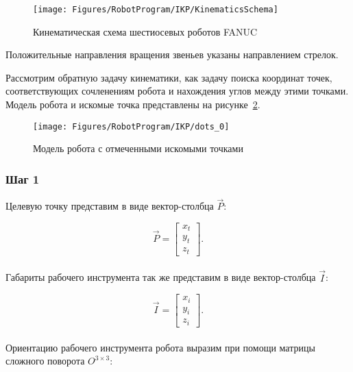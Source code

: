 \begin{figure}[H]
    \centering
    \vspace{14pt}
    \texttt{[image: Figures/RobotProgram/IKP/KinematicsSchema]}
    \caption{Кинематическая схема шестиосевых роботов FANUC}
    \label{fig:RobotProgram:IKP:KinematicsSchema}
\end{figure}

Положительные направления вращения звеньев указаны направлением стрелок.

Рассмотрим обратную задачу кинематики, как задачу поиска координат точек, соответствующих сочленениям робота и нахождения углов между этими точками.
Модель робота и искомые точка представлены на рисунке~\ref{fig:RobotProgram:IKP:dots_0}.

\begin{figure}[H]
    \centering
    \vspace{14pt}
    \texttt{[image: Figures/RobotProgram/IKP/dots\_0]}
    \caption{Модель робота с отмеченными искомыми точками}
    \label{fig:RobotProgram:IKP:dots_0}
\end{figure}

\subsubsection*{Шаг 1}
Целевую точку представим в виде вектор-столбца $\overrightarrow{P}$:

\begin{equation*}
    \overrightarrow{P} =
    \begin{bmatrix}
        x_t \\
        y_t \\
        z_t
    \end{bmatrix}.
\end{equation*} \\

Габариты рабочего инструмента так же представим в виде вектор-столбца $\overrightarrow{I}$:

\begin{equation*}
    \overrightarrow{I} =
    \begin{bmatrix}
        x_i \\
        y_i \\
        z_i
    \end{bmatrix}.
\end{equation*} \\

Ориентацию рабочего инструмента робота выразим при помощи матрицы сложного поворота $O^{3\times3}$:

